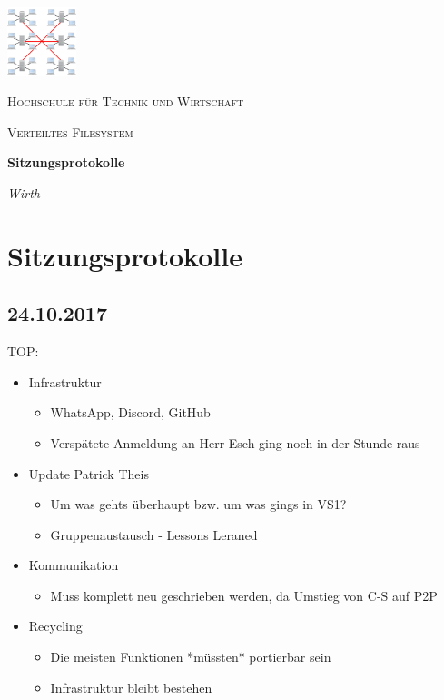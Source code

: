 \documentclass[a4paper,11pt]{article}
\begin{document}
\begin{titlepage}
	\centering
	\includegraphics[width=0.15\textwidth]{Federation.png}\par\vspace{1cm} %
	{\scshape\LARGE Hochschule f\"ur Technik und Wirtschaft  \par}
	\vspace{1cm}
	{\scshape\Large Verteiltes Filesystem\par}
	\vspace{1.5cm}
	{\huge\bfseries Sitzungsprotokolle \par}
	\vspace{2cm}
	{\Large\itshape Wirth\par}
	\vfill

	\vfill
	{\large \par}
\end{titlepage}
\tableofcontents
\pagebreak

\section{Sitzungsprotokolle}
\subsection{24.10.2017}
TOP:
\begin{itemize}
\setlength\itemsep{0em}
\item Infrastruktur
	\begin{itemize}
	\setlength\itemsep{0.2em}
		\item WhatsApp, Discord, GitHub
		\item Verspätete Anmeldung an Herr Esch ging noch in der Stunde raus
	\end{itemize} 
\item Update Patrick Theis
	\begin{itemize}
		\item Um was gehts überhaupt bzw. um was gings in VS1?
		\item Gruppenaustausch - Lessons Leraned
	\end{itemize}
\item Kommunikation
	\begin{itemize}
		\item Muss komplett neu geschrieben werden, da Umstieg von C-S auf P2P
	\end{itemize}
\item Recycling
	\begin{itemize}
		\item Die meisten Funktionen *müssten* portierbar sein
		\item Infrastruktur bleibt bestehen
	\end{itemize}
\end{itemize}
\end{document}
